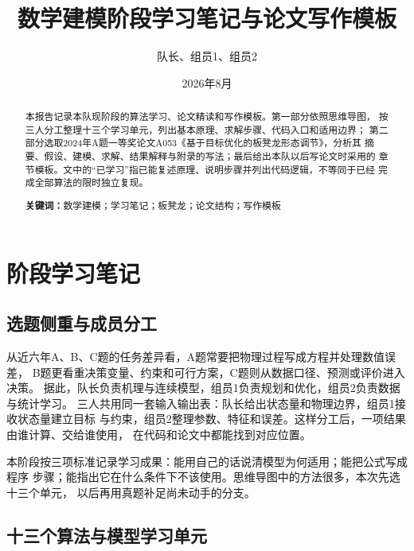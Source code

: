 \documentclass[UTF8,zihao=-4]{ctexart}
\title{\bfseries 数学建模阶段学习笔记与论文写作模板}
\author{队长、组员1、组员2}
\date{2026年8月}
\begin{document}
\maketitle

\begin{abstract}
本报告记录本队现阶段的算法学习、论文精读和写作模板。第一部分依照思维导图，
按三人分工整理十三个学习单元，列出基本原理、求解步骤、代码入口和适用边界；
第二部分选取2024年A题一等奖论文A053《基于目标优化的板凳龙形态调节》，分析其
摘要、假设、建模、求解、结果解释与附录的写法；最后给出本队以后写论文时采用的
章节模板。文中的“已学习”指已能复述原理、说明步骤并列出代码逻辑，不等同于已经
完成全部算法的限时独立复现。

\par\noindent\textbf{关键词：}数学建模；学习笔记；板凳龙；论文结构；写作模板
\end{abstract}

\tableofcontents
\newpage

\section{阶段学习笔记}

\subsection{选题侧重与成员分工}

从近六年A、B、C题的任务差异看，A题常要把物理过程写成方程并处理数值误差，
B题更看重决策变量、约束和可行方案，C题则从数据口径、预测或评价进入决策。
据此，队长负责机理与连续模型，组员1负责规划和优化，组员2负责数据与统计学习。
三人共用同一套输入输出表：队长给出状态量和物理边界，组员1接收状态量建立目标
与约束，组员2整理参数、特征和误差。这样分工后，一项结果由谁计算、交给谁使用，
在代码和论文中都能找到对应位置。

本阶段按三项标准记录学习成果：能用自己的话说清模型为何适用；能把公式写成程序
步骤；能指出它在什么条件下不该使用。思维导图中的方法很多，本次先选十三个单元，
以后再用真题补足尚未动手的分支。

\subsection{十三个算法与模型学习单元}
\end{document}
